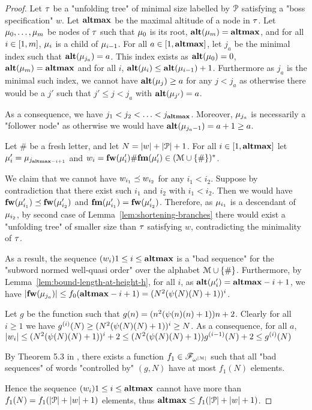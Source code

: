 \begin{proof}
	Let $\tau$ be a "unfolding tree" of minimal size labelled by $\mathcal{P}$ satisfying a "boss specification" $w$. Let $\mathbf{altmax}$ be the maximal altitude of a node in $\tau$. Let $\mu_0, \ldots, \mu_m$ be nodes of $\tau$ such that $\mu_0$ is its root, $\mathbf{alt}(\mu_m) = \mathbf{altmax}$, and for all $i\in [1,m]$, $\mu_i$ is a child of $\mu_{i-1}$.
	For all $a \in [1,\mathbf{altmax}]$, let $j_a$ be the minimal index such that $\mathbf{alt}(\mu_{j_a}) = a$. This index exists as $\mathbf{alt}(\mu_0) = 0$, $\mathbf{alt}(\mu_m) = \mathbf{altmax}$ and for all $i$, $\mathbf{alt}(\mu_{i}) \leq \mathbf{alt}(\mu_{i-1})+1$.
	Furthermore as $j_a$ is the minimal such index, we cannot have $\mathbf{alt}(\mu_j) \geq a$ for any $j < j_a$ as otherwise there would be a $j'$ such that $j' \leq j < j_a$ with $\mathbf{alt}(\mu_{j'}) = a$.
	
	As a consequence, we have $j_1 < j_2 < \ldots < j_{\mathbf{altmax}}$. Moreover, $\mu_{j_a}$ is necessarily a "follower node" as otherwise we would have $\mathbf{alt}(\mu_{j_a-1}) = a+1 \geq a$.
	
	Let $\#$ be a fresh letter, and let $N = |w| + |\mathcal{P}|+1$. For all $i \in [1,\mathbf{altmax}]$ let $\mu'_i = \mu_{j_{\mathbf{altmax} - i+1}}$ and $w_i = \mathbf{fw}(\mu'_{i}) \# \mathbf{fm}(\mu'_{i}) \in (\mathcal{M} \cup \{\#\})^*$.
	
	We claim that we cannot have $w_{i_1}\preceq w_{i_2}$ for any  $i_1< i_2$.
	Suppose by contradiction that there exist such $i_1$ and $i_2$ with $i_1 < i_2$. Then we would have $\mathbf{fw}(\mu'_{i_1}) \preceq \mathbf{fw}(\mu'_{i_2})$ and $\mathbf{fm}(\mu'_{i_1}) = \mathbf{fw}(\mu'_{i_2})$.
	Therefore, as $\mu_{i_1}$ is a descendant of $\mu_{i_2}$, by second case of Lemma~\ref{lem:shortening-branches} there would exist a "unfolding tree" of smaller size than $\tau$ satisfying $w$, contradicting the minimality of $\tau$.
	
	As a result, the sequence $(w_i){1\leq i \leq \mathbf{altmax}}$ is a "bad sequence" for the "subword normed well-quasi order" over the alphabet $\mathcal{M}\cup\{\#\}$.
	Furthermore, by Lemma~\ref{lem:bound-length-at-height-h}, for all $i$, as $\mathbf{alt}(\mu'_{i}) = \mathbf{altmax}-i+1$, we have $|\mathbf{fw}(\mu_{j_a})| \leq f_0(\mathbf{altmax}-i+1) = (N^2(\psi(N)(N)+1))^{i}$.
	
	Let $g$ be the function such that $g(n) = (n^2(\psi(n)(n)+1))n+2$. Clearly for all $i\geq 1$ we have $g^{(i)}(N) \geq (N^2(\psi(N)(N)+1))^{i} \geq N$.
	As a consequence, for all $a$, $|w_i| \leq (N^2(\psi(N)(N)+1))^{i} + 2 \leq (N^2(\psi(N)(N)+1)) g^{(i-1)}(N) + 2 \leq g^{(i)}(N)$
	
	By Theorem 5.3 in \cite{SchmitzS2011upperHigman}, there exists a function $f_1 \in \mathscr{F}_{\omega^{|\mathcal{M}|}}$ such that all  "bad sequences" of words "controlled by" $(g,N)$ have at most $f_1(N)$ elements.
	
	Hence the sequence $(w_i){1\leq i \leq \mathbf{altmax}}$ cannot have more than $f_1(N) = f_1(|\mathcal{P}| + |w| + 1)$ elements, thus $\mathbf{altmax} \leq f_1(|\mathcal{P}| + |w| + 1)$.
\end{proof}

